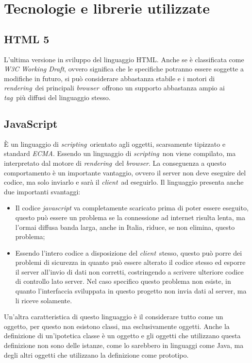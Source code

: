 \section{Tecnologie e librerie utilizzate}
\subsection{HTML 5}
L'ultima versione in sviluppo del linguaggio HTML. Anche se è classificata come \textit{W3C Working Draft}, ovvero significa che le specifiche potranno essere soggette a modifiche in futuro, si può considerare abbastanza stabile e i motori di \textit{rendering}\ dei principali \textit{browser}\ offrono un supporto abbastanza ampio ai \textit{tag}\ più diffusi del linguaggio stesso.
\subsection{JavaScript}
È un linguaggio di \textit{scripting}\ orientato agli oggetti, scarsamente tipizzato e standard \textit{ECMA}. Essendo un linguaggio di \textit{scripting}\ non viene compilato, ma interpretato dal motore di \textit{rendering}\ del \textit{browser}. La conseguenza a questo comportamento è un importante vantaggio, ovvero il server non deve eseguire del codice, ma solo inviarlo e sarà il \textit{client}\ ad eseguirlo. Il linguaggio presenta anche due importanti svantaggi:
\begin{itemize}
\item Il codice \textit{javascript} va completamente scaricato prima di poter essere eseguito, questo può essere un problema se la connessione ad internet risulta lenta, ma l'ormai diffusa banda larga, anche in Italia, riduce, se non elimina, questo problema;
\item Essendo l'intero codice a disposizione del \textit{client}\ stesso, questo può porre dei problemi  di sicurezza in quanto può essere alterato il codice stesso ed esporre il server all'invio di dati non corretti, costringendo a scrivere ulteriore codice di controllo lato server. Nel caso specifico questo problema non esiste, in quanto l'interfaccia sviluppata in questo progetto non invia dati al server, ma li riceve solamente.
\end{itemize}
Un'altra caratteristica di questo linguaggio è il considerare tutto come un oggetto, per questo non esistono classi, ma esclusivamente oggetti. Anche la definizione di un'ipotetica classe è un oggetto e gli oggetti che utilizzano questa definizione non sono delle istanze, come lo sarebbero in linguaggi come Java, ma degli altri oggetti che utilizzano la definizione come prototipo.
